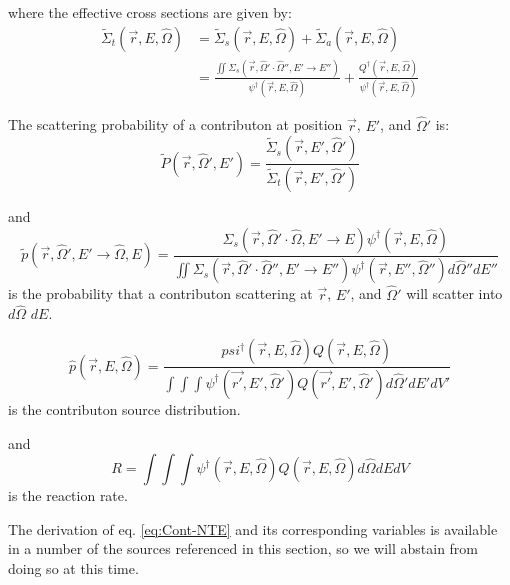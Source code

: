 where the effective cross sections are given by:
\begin{equation}
\begin{aligned}
\widetilde{\Sigma}_{t}(\vec{r}, E, \hat\Omega) &= \widetilde{\Sigma}_{s}(\vec{r}, E, \hat\Omega) + \widetilde{\Sigma}_{a}(\vec{r}, E, \hat\Omega) 
\\
&= \frac{\iint \Sigma_{s}(\vec{r},\hat\Omega'\cdot\hat\Omega'',E'\rightarrow E'')}
{\psi^{\dagger}(\vec{r}, E, \hat\Omega)}
+ \frac{Q^{\dagger}(\vec{r}, E, \hat\Omega)}{\psi^{\dagger}(\vec{r}, E, \hat\Omega)}
\end{aligned}
\end{equation}

The scattering probability of a contributon at position $\vec{r}$, $E'$, and $\hat\Omega'$ is:
\begin{equation}
\widetilde{P}(\vec{r}, \hat\Omega',E') = \frac{\widetilde{\Sigma} _{ s }(\vec{r}, E', \hat\Omega')}{\widetilde{\Sigma} _{ t }(\vec{r}, E', \hat\Omega')}
\end{equation}

and
\begin{equation}
\widetilde{p}(\vec{r}, \hat\Omega', E'\rightarrow\hat\Omega, E) =
\frac{\Sigma_{s}(\vec{r},\hat\Omega'\cdot\hat\Omega,E'\rightarrow E) \psi^{\dagger} (\vec{r}, E, \hat\Omega)}
{\iint \Sigma_{s}(\vec{r},\hat\Omega'\cdot\hat\Omega'',E'\rightarrow E'')\psi^{\dagger} (\vec{r}, E'', \hat\Omega'')d\hat\Omega'' dE''}
\end{equation}
is the probability that a contributon scattering at $\vec{r}$, $E'$, and $\hat\Omega'$ will scatter into $d\hat\Omega$ $dE$. 

\begin{equation}
\hat p(\vec{r}, E, \hat\Omega) =
\frac{psi^{\dagger}(\vec{r}, E, \hat\Omega) Q(\vec{r},E,\hat\Omega)}
{\int \int \int \psi^{\dagger}(\vec{r'},E',\hat\Omega')Q(\vec{r'},E',\hat\Omega') d\hat\Omega' dE' dV'}
\end{equation}
is the contributon source distribution.

and
\begin{equation}
R = \int \int \int \psi^{\dagger}(\vec{r},E,\hat\Omega)Q(\vec{r},E,\hat\Omega) d\hat\Omega dE dV
\end{equation}
is the reaction rate.


The derivation of eq. \ref{eq:Cont-NTE} and its corresponding variables is available in a number of the sources referenced in this section, so we will abstain from doing so at this time. 

